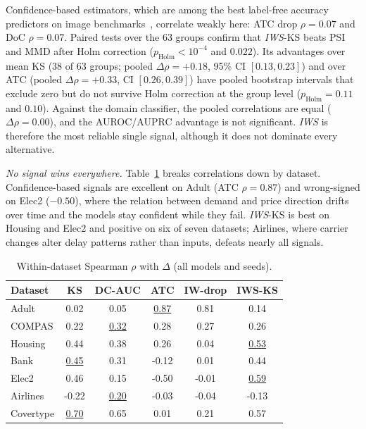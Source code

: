 \documentclass[conference]{IEEEtran}
\theoremstyle{plainhead}
\newcommand{\iws}{\textit{IWS}}
\begin{document}
Confidence-based estimators, which are among the best label-free accuracy predictors on image benchmarks~\cite{deng2023confidence,xie2024mano}, correlate weakly here: ATC drop $\rho=0.07$ and DoC $\rho=0.07$. Paired tests over the 63 groups confirm that \iws{}-KS beats PSI and MMD after Holm correction ($p_\text{Holm}<10^{-4}$ and $0.022$). Its advantages over mean KS (38 of 63 groups; pooled $\Delta\rho=+0.18$, 95\% CI $[0.13,0.23]$) and over ATC (pooled $\Delta\rho=+0.33$, CI $[0.26,0.39]$) have pooled bootstrap intervals that exclude zero but do not survive Holm correction at the group level ($p_\text{Holm}=0.11$ and $0.10$). Against the domain classifier, the pooled correlations are equal ($\Delta\rho=0.00$), and the AUROC/AUPRC advantage is not significant. \iws{} is therefore the most reliable single signal, although it does not dominate every alternative.

\textit{No signal wins everywhere.} Table~\ref{tab:perds} breaks correlations down by dataset. Confidence-based signals are excellent on Adult (ATC $\rho=0.87$) and wrong-signed on Elec2 ($-0.50$), where the relation between demand and price direction drifts over time and the models stay confident while they fail. \iws{}-KS is best on Housing and Elec2 and positive on six of seven datasets; Airlines, where carrier changes alter delay patterns rather than inputs, defeats nearly all signals.

\begin{table}[t]
\centering
\caption{Within-dataset Spearman $\rho$ with $\Delta$ (all models and seeds).}
\label{tab:perds}
\footnotesize
\begin{tabular}{lccccc}
\toprule
Dataset & KS & DC-AUC & ATC & IW-drop & IWS-KS \\
\midrule
Adult & 0.02 & 0.05 & \underline{0.87} & 0.81 & 0.14 \\
COMPAS & 0.22 & \underline{0.32} & 0.28 & 0.27 & 0.26 \\
Housing & 0.44 & 0.38 & 0.26 & 0.04 & \underline{0.53} \\
Bank & \underline{0.45} & 0.31 & -0.12 & 0.01 & 0.44 \\
Elec2 & 0.46 & 0.15 & -0.50 & -0.01 & \underline{0.59} \\
Airlines & -0.22 & \underline{0.20} & -0.03 & -0.04 & -0.13 \\
Covertype & \underline{0.70} & 0.65 & 0.01 & 0.21 & 0.57 \\
\bottomrule
\end{tabular}
\end{table}
\end{document}
